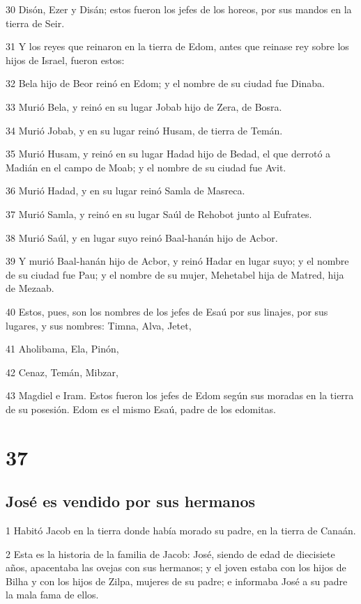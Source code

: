 30 Disón, Ezer y Disán; estos fueron los jefes de los horeos, por sus mandos en la tierra de Seir.

31 Y los reyes que reinaron en la tierra de Edom, antes que reinase rey sobre los hijos de Israel, fueron estos:

32 Bela hijo de Beor reinó en Edom; y el nombre de su ciudad fue Dinaba.

33 Murió Bela, y reinó en su lugar Jobab hijo de Zera, de Bosra.

34 Murió Jobab, y en su lugar reinó Husam, de tierra de Temán.

35 Murió Husam, y reinó en su lugar Hadad hijo de Bedad, el que derrotó a Madián en el campo de Moab; y el nombre de su ciudad fue Avit.

36 Murió Hadad, y en su lugar reinó Samla de Masreca.

37 Murió Samla, y reinó en su lugar Saúl de Rehobot junto al Eufrates.

38 Murió Saúl, y en lugar suyo reinó Baal-hanán hijo de Acbor.

39 Y murió Baal-hanán hijo de Acbor, y reinó Hadar en lugar suyo; y el nombre de su ciudad fue Pau; y el nombre de su mujer, Mehetabel hija de Matred, hija de Mezaab.

40 Estos, pues, son los nombres de los jefes de Esaú por sus linajes, por sus lugares, y sus nombres: Timna, Alva, Jetet,

41 Aholibama, Ela, Pinón,

42 Cenaz, Temán, Mibzar,

43 Magdiel e Iram. Estos fueron los jefes de Edom según sus moradas en la tierra de su posesión. Edom es el mismo Esaú, padre de los edomitas.

\chapter{37}

\section{José es vendido por sus hermanos}

1 Habitó Jacob en la tierra donde había morado su padre, en la tierra de Canaán.

2 Esta es la historia de la familia de Jacob: José, siendo de edad de diecisiete años, apacentaba las ovejas con sus hermanos; y el joven estaba con los hijos de Bilha y con los hijos de Zilpa, mujeres de su padre; e informaba José a su padre la mala fama de ellos.

